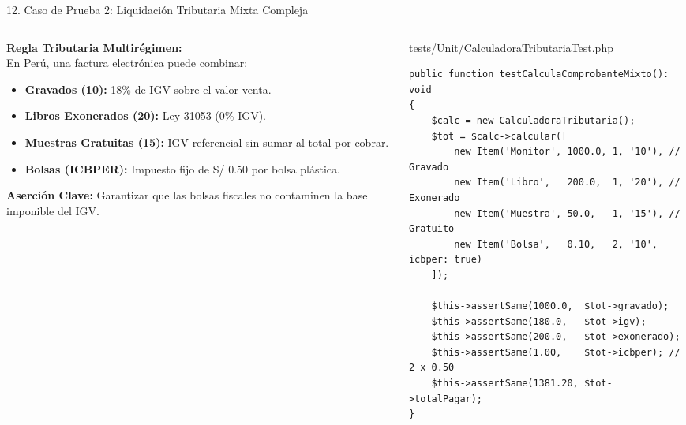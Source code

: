 \documentclass[aspectratio=169,10pt]{beamer}
\begin{document}
\begin{frame}[fragile]{12. Caso de Prueba 2: Liquidación Tributaria Mixta Compleja}
\begin{columns}
\begin{column}{0.48\textwidth}
    \fontsize{6.8pt}{8.2pt}\selectfont\color{textwhite}
    \textbf{Regla Tributaria Multirégimen:}\\[0.1cm]
    En Perú, una factura electrónica puede combinar:
    \begin{itemize}
        \item \textbf{Gravados (10):} 18\% de IGV sobre el valor venta.
        \item \textbf{Libros Exonerados (20):} Ley 31053 (0\% IGV).
        \item \textbf{Muestras Gratuitas (15):} IGV referencial sin sumar al total por cobrar.
        \item \textbf{Bolsas (ICBPER):} Impuesto fijo de S/ 0.50 por bolsa plástica.
    \end{itemize}
    \vspace{0.08cm}
    \textbf{Aserción Clave:} Garantizar que las bolsas fiscales no contaminen la base imponible del IGV.
\end{column}
\begin{column}{0.52\textwidth}
    \begin{codebox}{tests/Unit/CalculadoraTributariaTest.php}
\begin{lstlisting}
public function testCalculaComprobanteMixto(): void 
{
    $calc = new CalculadoraTributaria();
    $tot = $calc->calcular([
        new Item('Monitor', 1000.0, 1, '10'), // Gravado
        new Item('Libro',   200.0,  1, '20'), // Exonerado
        new Item('Muestra', 50.0,   1, '15'), // Gratuito
        new Item('Bolsa',   0.10,   2, '10', icbper: true)
    ]);

    $this->assertSame(1000.0,  $tot->gravado);
    $this->assertSame(180.0,   $tot->igv);
    $this->assertSame(200.0,   $tot->exonerado);
    $this->assertSame(1.00,    $tot->icbper); // 2 x 0.50
    $this->assertSame(1381.20, $tot->totalPagar);
}
\end{lstlisting}
    \end{codebox}
\end{column}
\end{columns}
\end{frame}
\end{document}
